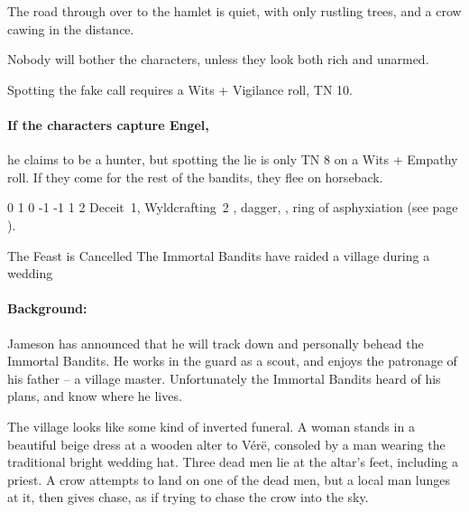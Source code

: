 \begin{multicols}{2}
\begin{boxtext}

  The road through over to the hamlet is quiet, with only rustling trees, and a crow cawing in the distance.

\end{boxtext}

Nobody will bother the characters, unless they look both rich and unarmed.

Spotting the fake call requires a Wits + Vigilance roll, TN 10.

\paragraph{If the characters capture Engel,}
he claims to be a hunter, but spotting the lie is only TN 8 on a Wits + Empathy roll.
If they come for the rest of the bandits, they flee on horseback.


{0}%
{1}%
{{0}%
{-1}%
{-1}}%
{1}%
{2}%
{Deceit~1, Wyldcrafting~2}%
{\shortsword, dagger, \partialleather, ring of asphyxiation (see page \pageref{ring_asphyxiation}).}%
{}

{The Feast is Cancelled}%
{The Immortal Bandits have raided a village during a wedding}%

\paragraph{Background:}
Jameson has announced that he will track down and personally behead the Immortal Bandits.
He works in the \gls{guard} as a scout, and enjoys the patronage of his father -- a village master.
Unfortunately the Immortal Bandits heard of his plans, and know where he lives.

\begin{boxtext}

  The village looks like some kind of inverted funeral.
  A woman stands in a beautiful beige dress at a wooden alter to V\'{e}r\"{e}, consoled by a man wearing the traditional bright wedding hat.
  Three dead men lie at the altar's feet, including a priest.
  A crow attempts to land on one of the dead men, but a local man lunges at it, then gives chase, as if trying to chase the crow into the sky.

\end{boxtext}


\end{multicols}
